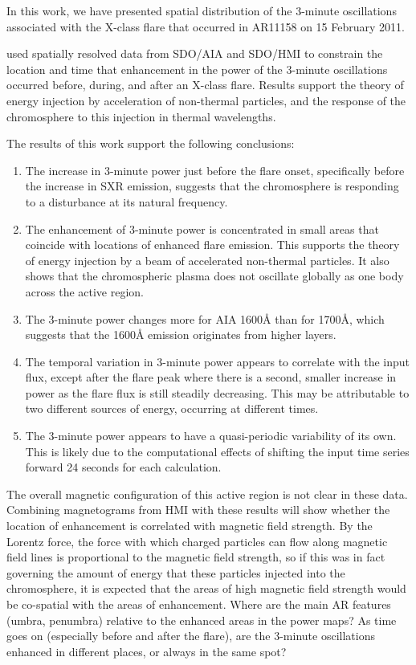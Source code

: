 In this work, we have presented spatial distribution of the 3-minute oscillations
associated with the X-class flare that occurred in AR11158 on 15 February 2011.

used spatially resolved data from
SDO/AIA and SDO/HMI
to constrain the location and time that enhancement in the power
of the 3-minute oscillations occurred before, during, and after
an X-class flare.
Results support the theory of energy
injection by acceleration of non-thermal particles, and the response
of the chromosphere to this injection in thermal wavelengths.

The results of this work support the following conclusions:
\begin{enumerate}
    \item The increase in 3-minute power just before the flare onset,
        specifically before the increase in SXR emission, suggests that the
        chromosphere is responding to a disturbance at its natural frequency.
    \item The enhancement of 3-minute
        power is concentrated in small areas that coincide with locations
        of enhanced flare emission. This supports the theory of
        energy injection by a beam of accelerated non-thermal particles.
        It also shows that the chromospheric plasma does not oscillate
        globally as one body across the active region.
    \item The 3-minute power changes more for
        AIA 1600\AA{} than for 1700\AA{}, which suggests that the 1600\AA{}
        emission originates from higher layers.
    \item The temporal variation in 3-minute power appears to correlate with
        the input flux, except after the flare peak where there is a second,
        smaller increase in power as the flare flux is still steadily decreasing.
        This may be attributable to two different sources of energy,
        occurring at different times.
    \item The 3-minute power appears to have a quasi-periodic variability
        of its own. This is likely due to the computational effects of
        shifting the input time series forward 24 seconds for each calculation.
\end{enumerate}

The overall magnetic configuration of this active region is not clear in these
data. Combining magnetograms from HMI with these results will show whether the
location of enhancement is correlated with magnetic field strength. By the
Lorentz force, the force with which charged particles can flow along magnetic
field lines is proportional to the magnetic field strength, so if this was in
fact governing the amount of energy that these particles injected into the
chromosphere, it is expected that the areas of high magnetic field strength
would be co-spatial with the areas of enhancement. Where are the main AR
features (umbra, penumbra) relative to the enhanced areas in the power maps? As
time goes on (especially before and after the flare), are the 3-minute
oscillations enhanced in different places, or always in the same spot?


